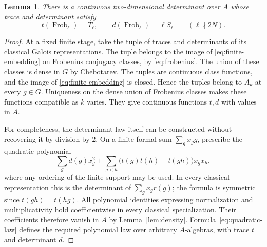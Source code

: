 \documentclass[11pt]{article}
\newtheorem{lemma}[theorem]{Lemma}
\theoremstyle{remark}
\numberwithin{equation}{section}
\DeclareMathOperator{\Frob}{Frob}
\begin{document}
\begin{lemma}\label{lem:determinant}
There is a continuous two-dimensional determinant over $A$ whose
trace and determinant satisfy
\[
 t(\Frob_\ell)=T_\ell,\qquad
 d(\Frob_\ell)=\ell S_\ell\qquad(\ell\nmid2N).
\]
\end{lemma}
\begin{proof}
At a fixed finite stage, take the tuple of traces and determinants
of its classical Galois representations. The tuple belongs to the
image of \eqref{eq:finite-embedding} on Frobenius conjugacy classes,
by \eqref{eq:frobenius}. The union of these classes is dense in $G$
by Chebotarev. The tuples are continuous class functions, and the
image of \eqref{eq:finite-embedding} is closed. Hence the tuples
belong to $A_k$ at every $g\in G$. Uniqueness on the dense union of
Frobenius classes makes these functions compatible as $k$ varies.
They give continuous functions $t,d$ with values in $A$.

For completeness, the determinant law itself can be constructed
without recovering it by division by $2$. On a finite formal sum
$\sum_g x_g g$, prescribe the quadratic polynomial
\begin{equation}\label{eq:quadratic-law}
 \sum_g d(g)x_g^2+
 \sum_{g<h}\bigl(t(g)t(h)-t(gh)\bigr)x_gx_h,
\end{equation}
where any ordering of the finite support may be used. In every
classical representation this is the determinant of
$\sum_g x_g r(g)$; the formula is symmetric since $t(gh)=t(hg)$.
All polynomial identities expressing normalization and
multiplicativity hold coefficientwise in every classical
specialization. Their coefficients therefore vanish in $A$ by
Lemma~\ref{lem:density}. Formula~\eqref{eq:quadratic-law} defines
the required polynomial law over arbitrary $A$-algebras, with trace
$t$ and determinant $d$.
\end{proof}
\end{document}
